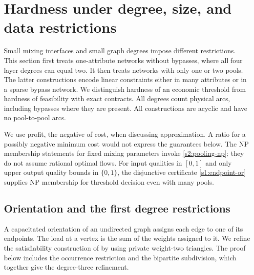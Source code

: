 \section{Hardness under degree, size, and data restrictions}\label{s3:hardness}

Small mixing interfaces and small graph degrees impose different restrictions.
This section first treats one-attribute networks without bypasses, where all
four layer degrees can equal two. It then treats networks with only one or
two pools. The latter constructions encode linear constraints either in
many attributes or in a sparse bypass network. We distinguish hardness of
an economic threshold from hardness of feasibility with exact contracts.
All degrees count physical arcs, including bypasses where they are present.
All constructions are acyclic and have no pool-to-pool arcs.

We use profit, the negative of cost, when discussing approximation. A ratio
for a possibly negative minimum cost would not express the guarantees below.
The NP membership statements for fixed mixing parameters invoke
\cref{s2:pooling-np}; they do not assume rational optimal flows. For
input qualities in $[0,1]$ and only upper output quality bounds in
$\{0,1\}$, the disjunctive certificate \eqref{s1:endpoint-or} supplies
NP membership for threshold decision even with many pools.

\subsection{Orientation and the first degree restrictions}\label{s3:orientation}

A capacitated orientation of an undirected graph assigns each edge to one
of its endpoints. The load at a vertex is the sum of the weights assigned
to it. We refine the satisfiability construction of
\citet[Section~5]{s3:asahiro2011} by using private weight-two triangles.
The proof below includes the occurrence restriction and the bipartite
subdivision, which together give the degree-three refinement.

